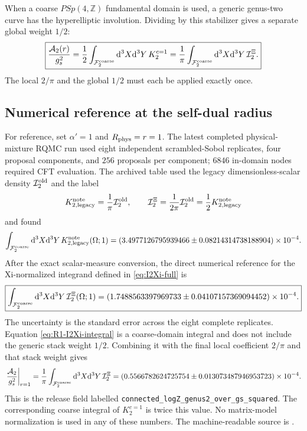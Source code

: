 \documentclass[11pt]{article}
\numberwithin{equation}{section}
\newcommand{\A}{\alpha'}
\newcommand{\dd}{\mathrm d}
\newcommand{\cA}{\mathcal A}
\newcommand{\cF}{\mathcal F}
\newcommand{\cI}{\mathcal I}
\begin{document}
When a coarse $PSp(4,\mathbb Z)$ fundamental domain is used, a generic
genus-two curve has the hyperelliptic involution.  Dividing by this stabilizer
gives a separate global weight $1/2$:
\begin{equation}
 \boxed{
 \frac{\cA_2(r)}{g_s^2}
 =\frac12\int_{\cF_2^{\rm coarse}}
 \dd^3X\dd^3Y\,K_2^{c=1}
 =\frac1\pi\int_{\cF_2^{\rm coarse}}
 \dd^3X\dd^3Y\,\cI_2^\Xi.}
 \label{eq:final-amplitude-full}
\end{equation}
The local $2/\pi$ and the global $1/2$ must each be applied exactly once.

\subsection{Numerical reference at the self-dual radius}

For reference, set $\A=1$ and $R_{\rm phys}=r=1$.  The latest completed
physical-mixture RQMC run used eight independent scrambled-Sobol replicates,
four proposal components, and $256$ proposals per component; $6846$ in-domain
nodes required CFT evaluation.  The archived table used the legacy
dimensionless-scalar density $\cI_2^{\rm old}$ and the label
\begin{equation}
 K_{2,\rm legacy}^{\rm note}=\frac1\pi\cI_2^{\rm old},
 \qquad
 \cI_2^\Xi=\frac1{2\pi}\cI_2^{\rm old}
             =\frac12K_{2,\rm legacy}^{\rm note}
\end{equation}
and found
\begin{equation}
 \int_{\cF_2^{\rm coarse}}\dd^3X\dd^3Y\,
 K_{2,\rm legacy}^{\rm note}(\Omega;1)
 =\left(3.4977126795939466
 \mathbin{\pm}0.08214314738188904\right)\times10^{-4}.
 \label{eq:R1-saved-Knote-integral}
\end{equation}
After the exact scalar-measure conversion, the direct numerical reference for
the Xi-normalized integrand
defined in \eqref{eq:I2Xi-full} is
\begin{equation}
 \boxed{
 \int_{\cF_2^{\rm coarse}}\dd^3X\dd^3Y\,
 \cI_2^\Xi(\Omega;1)
 =\left(1.7488563397969733
 \mathbin{\pm}0.04107157369094452\right)\times10^{-4}.}
 \label{eq:R1-I2Xi-integral}
\end{equation}
The uncertainty is the standard error across the eight complete replicates.
Equation \eqref{eq:R1-I2Xi-integral} is a coarse-domain integral and does not
include the generic stack weight $1/2$.  Combining it with the final local
coefficient $2/\pi$ and that stack weight gives
\begin{equation}
 \left.\frac{\cA_2}{g_s^2}\right|_{r=1}
 =\frac1\pi\int_{\cF_2^{\rm coarse}}\dd^3X\dd^3Y\,\cI_2^\Xi
 =\left(0.5566782624725754
 \mathbin{\pm}0.013073487946953723\right)\times10^{-4}.
 \label{eq:R1-final-amplitude-reference}
\end{equation}
This is the release field labelled
\texttt{connected\_logZ\_genus2\_over\_gs\_squared}.  The corresponding
coarse integral of $K_2^{c=1}$ is twice this value.  No matrix-model
normalization is used in any of these numbers.  The machine-readable source is
.
\end{document}
